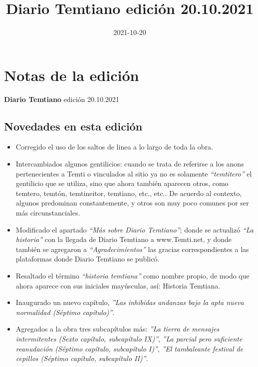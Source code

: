 \documentclass[
  spanish,
]{book}
\title{Diario Temtiano edición 20.10.2021}
\author{}
\date{\vspace{-2.5em}2021-10-20}
\begin{document}
\maketitle

{
\setcounter{tocdepth}{1}
\tableofcontents
}
\hypertarget{notas-de-la-ediciuxf3n}{%
\chapter*{Notas de la edición}\label{notas-de-la-ediciuxf3n}}

\textbf{Diario Temtiano} edición 20.10.2021

\hypertarget{novedades-en-esta-ediciuxf3n}{%
\section*{Novedades en esta edición}\label{novedades-en-esta-ediciuxf3n}}

\begin{itemize}
\item
  Corregido el uso de los saltos de linea a lo largo de toda la obra.
\item
  Intercambiados algunos gentilicios: cuando se trata de referirse a los anons pertenecientes a Temti o vinculados al sitio ya no es solamente \emph{``temtitero''} el gentilicio que se utiliza, sino que ahora también aparecen otros, como temtero, temtón, temtineitor, temtiano, etc., etc.. De acuerdo al contexto, algunos predominan constantemente, y otros son muy poco comunes por ser más circunstanciales.
\item
  Modificado el apartado \emph{``Más sobre Diario Temtiano''}; donde se actualizó \emph{``La historia''} con la llegada de Diario Temtiano a www.Temti.net, y donde también se agregaron a \emph{``Agradecimientos''} las gracias correspondientes a las plataformas donde Diario Temtiano se publicó.
\item
  Resaltado el término \emph{``historia temtiana''} como nombre propio, de modo que ahora aparece con sus iniciales mayúsculas, así: Historia Temtiana.
\item
  Inaugurado un nuevo capítulo, \emph{''Las inhibidas andanzas bajo la apta nueva normalidad (Séptimo capítulo)''}.
\item
  Agregados a la obra tres subcapítulos más: \emph{''La tierra de mensajes intermitentes (Sexto capítulo, subcapítulo IX)''}, \emph{''La parcial pero suficiente reanudación (Séptimo capítulo, subcapítulo I)''}, \emph{''El tambaleante festival de cepillos (Séptimo capítulo, subcapítulo II)''}.
\end{itemize}
\end{document}
